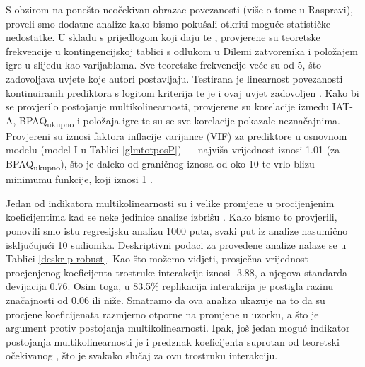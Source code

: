 \documentclass[a4paper, 12pt]{report}
\begin{document}
S obzirom na ponešto neočekivan obrazac povezanosti (više o tome u Raspravi),
proveli smo dodatne analize kako bismo pokušali otkriti moguće
statističke nedostatke. U skladu s prijedlogom koji daju \citet{fieldr} te
\citet{tabachnick2012multi}, provjerene su
teoretske frekvencije u kontingencijskoj tablici s odlukom u Dilemi zatvorenika i 
položajem igre u slijedu kao varijablama. Sve teoretske frekvencije veće su od
5, što zadovoljava uvjete koje autori postavljaju.
Testirana je linearnost povezanosti kontinuiranih prediktora s logitom
kriterija te je i ovaj uvjet zadovoljen \citep{fieldr, jaccard2001interaction}.
Kako bi se provjerilo postojanje multikolinearnosti, provjerene su korelacije
između IAT-A, BPAQ\textsubscript{ukupno} i položaja igre te su se sve korelacije
pokazale neznačajnima. Provjereni su iznosi faktora inflacije varijance (VIF) za
prediktore u osnovnom modelu (model I u Tablici \ref{glmtotposP}) --- 
najviša vrijednost iznosi 1.01 (za
BPAQ\textsubscript{ukupno}), što je daleko od graničnog iznosa od oko 10 te
vrlo blizu minimumu funkcije, koji iznosi 1
\citep{james2013introduction, fieldr, salkind2007encyclopedia}. 

Jedan od indikatora multikolinearnosti su i velike  promjene u procijenjenim
koeficijentima kad se neke jedinice analize izbrišu
\citep{salkind2007encyclopedia}. Kako bismo to provjerili, ponovili smo istu
regresijsku analizu 1000 puta, svaki put iz analize nasumično isključujući 10
sudionika. Deskriptivni podaci za provedene analize nalaze se u Tablici
\ref{deskr p robust}. Kao što možemo vidjeti, prosječna vrijednost procjenjenog
koeficijenta trostruke interakcije iznosi -3.88, a njegova standarda devijacija
0.76. Osim toga, u 83.5\% replikacija interakcija je postigla razinu
značajnosti od 0.06 ili niže. Smatramo da ova analiza ukazuje na to da su
procjene koeficijenata razmjerno otporne na promjene u uzorku, a što je argument
protiv postojanja multikolinearnosti.
Ipak, još jedan moguć
indikator postojanja multikolinearnosti je i predznak koeficijenta suprotan od teoretski
očekivanog \citep{salkind2007encyclopedia}, što je svakako slučaj za ovu trostruku interakciju.
\end{document}
